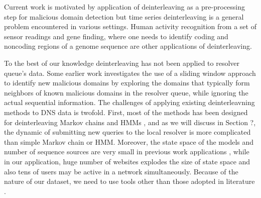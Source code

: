\documentclass[conference]{IEEEtran}
\begin{document}
	Current work is motivated by application of deinterleaving as a pre-processing step for malicious domain detection but time series deinterleaving is a general problem encountered in various settings. 
	Human activity recognition from a set of sensor readings \cite{minot2014separation, landwehr2008modeling} and gene finding, where one needs to identify coding and noncoding regions of a genome sequence \cite{burge1998finding, burge1997prediction} are other applications of deinterleaving. 
	

	To the best of our knowledge deinterleaving has not been applied to resolver queue's data.
	Some earlier work \cite{gao2013empirical} investigates the use of a sliding window approach to identify new malicious domains by exploring the domains that typically form neighbors of known malicious domains in the resolver queue, while ignoring the actual sequential information. 
	The challenges of applying existing deinterleavning methods to DNS data is twofold.
	First, most of the methods has been designed for deinterleaving Markov chains \cite{batu2004inferring, seroussi2009deinterleaving, seroussi2012deinterleaving, minot2014separation} and HMMs \cite{landwehr2008modeling}, and as we will discuss in Section ?, the dynamic of submitting new queries to the local resolver is more complicated than simple Markov chain or HMM.
	Moreover, the state space of the models and number of sequence sources are very small in previous work applications \cite{minot2014separation, landwehr2008modeling}, while in our application, huge number of websites explodes the size of state space and also tens of users may be active in a network simultaneously.
	Because of the nature of our dataset, we need to use tools other than those adopted in literature \cite{minot2014separation, landwehr2008modeling,burge1998finding, burge1997prediction}.

	
	
	
\end{document}
